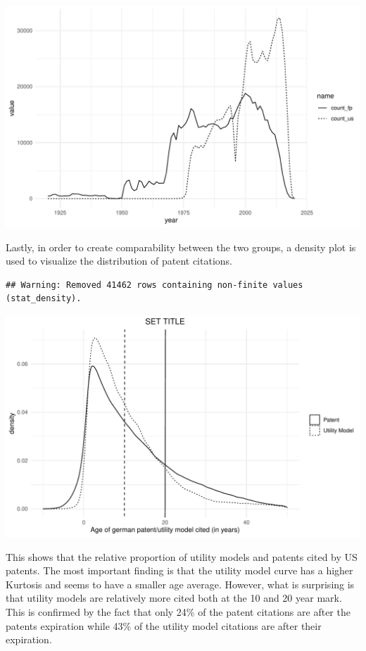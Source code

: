 \documentclass[
  12pt,
]{article}
\begin{document}
\includegraphics{ASR_Hausarbeit_files/figure-latex/graph_year_patents-1.pdf}

Lastly, in order to create comparability between the two groups, a
density plot is used to visualize the distribution of patent citations.

\begin{verbatim}
## Warning: Removed 41462 rows containing non-finite values (stat_density).
\end{verbatim}

\includegraphics{ASR_Hausarbeit_files/figure-latex/graph_density-1.pdf}

This shows that the relative proportion of utility models and patents
cited by US patents. The most important finding is that the utility
model curve has a higher Kurtosis and seems to have a smaller age
average. However, what is surprising is that utility models are
relatively more cited both at the 10 and 20 year mark. This is confirmed
by the fact that only 24\% of the patent citations are after the patents
expiration while 43\% of the utility model citations are after their
expiration.
\end{document}
